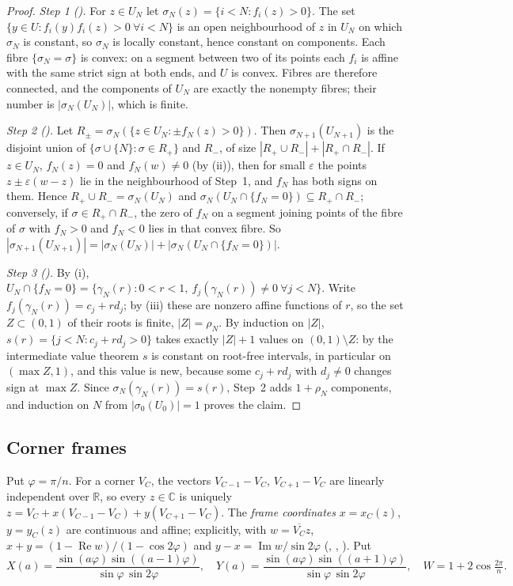 \documentclass[11pt]{amsart}
\theoremstyle{plain}
\theoremstyle{definition}
\newcommand{\C}{\mathbb{C}}
\newcommand{\re}{\operatorname{Re}}
\newcommand{\im}{\operatorname{Im}}
\begin{document}
\begin{proof}
\emph{Step 1 ().} For $z\in U_N$ let $\sigma_N(z)=\{i<N: f_i(z)>0\}$. The set $\{y\in U: f_i(y)f_i(z)>0\ \forall i<N\}$ is an open neighbourhood of $z$ in $U_N$ on which $\sigma_N$ is constant, so $\sigma_N$ is locally constant, hence constant on components. Each fibre $\{\sigma_N=\sigma\}$ is convex: on a segment between two of its points each $f_i$ is affine with the same strict sign at both ends, and $U$ is convex. Fibres are therefore connected, and the components of $U_N$ are exactly the nonempty fibres; their number is $|\sigma_N(U_N)|$, which is finite.

\emph{Step 2 ().} Let $R_\pm=\sigma_N(\{z\in U_N:\pm f_N(z)>0\})$. Then $\sigma_{N+1}(U_{N+1})$ is the disjoint union of $\{\sigma\cup\{N\}:\sigma\in R_+\}$ and $R_-$, of size $|R_+\cup R_-|+|R_+\cap R_-|$. If $z\in U_N$, $f_N(z)=0$ and $f_N(w)\ne0$ (by (ii)), then for small $\varepsilon$ the points $z\pm\varepsilon(w-z)$ lie in the neighbourhood of Step~1, and $f_N$ has both signs on them. Hence $R_+\cup R_-=\sigma_N(U_N)$ and $\sigma_N(U_N\cap\{f_N=0\})\subseteq R_+\cap R_-$; conversely, if $\sigma\in R_+\cap R_-$, the zero of $f_N$ on a segment joining points of the fibre of $\sigma$ with $f_N>0$ and $f_N<0$ lies in that convex fibre. So $|\sigma_{N+1}(U_{N+1})|=|\sigma_N(U_N)|+|\sigma_N(U_N\cap\{f_N=0\})|$.

\emph{Step 3 ().} By (i), $U_N\cap\{f_N=0\}=\{\gamma_N(r):0<r<1,\ f_j(\gamma_N(r))\ne0\ \forall j<N\}$. Write $f_j(\gamma_N(r))=c_j+rd_j$; by (iii) these are nonzero affine functions of $r$, so the set $Z\subset(0,1)$ of their roots is finite, $|Z|=\rho_N$. By induction on $|Z|$, $s(r)=\{j<N: c_j+rd_j>0\}$ takes exactly $|Z|+1$ values on $(0,1)\setminus Z$: by the intermediate value theorem $s$ is constant on root-free intervals, in particular on $(\max Z,1)$, and this value is new, because some $c_j+rd_j$ with $d_j\ne0$ changes sign at $\max Z$. Since $\sigma_N(\gamma_N(r))=s(r)$, Step~2 adds $1+\rho_N$ components, and induction on $N$ from $|\sigma_0(U_0)|=1$ proves the claim.
\end{proof}

\subsection{Corner frames}
Put $\varphi=\pi/n$. For a corner $V_C$, the vectors $V_{C-1}-V_C$, $V_{C+1}-V_C$ are linearly independent over $\mathbb{R}$, so every $z\in\C$ is uniquely $z=V_C+x(V_{C-1}-V_C)+y(V_{C+1}-V_C)$. The \emph{frame coordinates} $x=x_C(z)$, $y=y_C(z)$ are continuous and affine; explicitly, with $w=\overline{V_C}z$, $x+y=(1-\re w)/(1-\cos2\varphi)$ and $y-x=\im w/\sin2\varphi$ (, , ). Put
\[
X(a)=\frac{\sin(a\varphi)\sin((a-1)\varphi)}{\sin\varphi\,\sin2\varphi},\quad
Y(a)=\frac{\sin(a\varphi)\sin((a+1)\varphi)}{\sin\varphi\,\sin2\varphi},\quad W=1+2\cos\tfrac{2\pi}{n}.
\]
\end{document}
